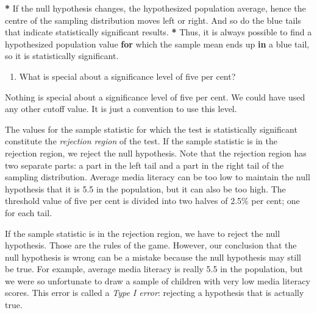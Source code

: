 \documentclass[a4paper]{book}
\newenvironment{Shaded}{\begin{snugshade}}{\end{snugshade}}
\newcommand{\StringTok}[1]{\textcolor[rgb]{0.00,0.00,0.00}{#1}}
\newcommand{\ControlFlowTok}[1]{\textcolor[rgb]{0.00,0.00,0.00}{\textbf{#1}}}
\newcommand{\OperatorTok}[1]{\textcolor[rgb]{0.00,0.00,0.00}{\textbf{#1}}}
\newcommand{\NormalTok}[1]{#1}
\providecommand{\tightlist}{%
  \setlength{\itemsep}{0pt}\setlength{\parskip}{0pt}}
\theoremstyle{definition}
\theoremstyle{definition}
\theoremstyle{definition}
\theoremstyle{remark}
\begin{document}
\begin{Shaded}
\begin{Highlighting}[]
\OperatorTok{*}\StringTok{ }\NormalTok{If the null hypothesis changes, the hypothesized population average, hence}
\NormalTok{the centre of the sampling distribution moves left or right. And so do the}
\NormalTok{blue tails that indicate statistically significant results.}
\OperatorTok{*}\StringTok{ }\NormalTok{Thus, it is always possible to find a hypothesized population value }\ControlFlowTok{for}
\NormalTok{which the sample mean ends up }\ControlFlowTok{in}\NormalTok{ a blue tail, so it is statistically}
\NormalTok{significant.}
\end{Highlighting}
\end{Shaded}

\begin{enumerate}
\def\labelenumi{\arabic{enumi}.}
\setcounter{enumi}{5}
\tightlist
\item
  What is special about a significance level of five per cent?
\end{enumerate}

\begin{Shaded}
\begin{Highlighting}[]
\NormalTok{Nothing is special about a significance level of five per cent. We could have}
\NormalTok{used any other cutoff value. It is just a convention to use this level.}
\end{Highlighting}
\end{Shaded}

The values for the sample statistic for which the test is statistically
significant constitute the \emph{rejection region} of the test. If the
sample statistic is in the rejection region, we reject the null
hypothesis. Note that the rejection region has two separate parts: a
part in the left tail and a part in the right tail of the sampling
distribution. Average media literacy can be too low to maintain the null
hypothesis that it is 5.5 in the population, but it can also be too
high. The threshold value of five per cent is divided into two halves of
2.5\% per cent; one for each tail.

If the sample statistic is in the rejection region, we have to reject
the null hypothesis. Those are the rules of the game. However, our
conclusion that the null hypothesis is wrong can be a mistake because
the null hypothesis may still be true. For example, average media
literacy is really 5.5 in the population, but we were so unfortunate to
draw a sample of children with very low media literacy scores. This
error is called a \emph{Type I error}: rejecting a hypothesis that is
actually true.
\end{document}
